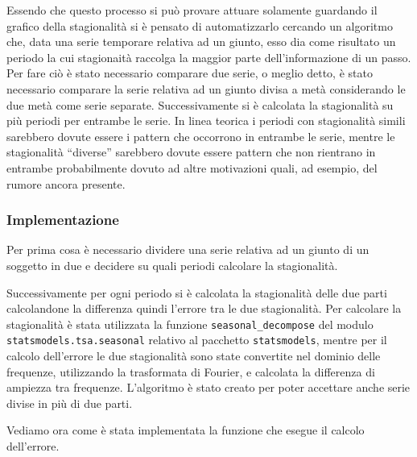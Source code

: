 Essendo che questo processo si può provare attuare solamente guardando il grafico della stagionalità
si è pensato di automatizzarlo cercando un algoritmo che, data una serie temporare relativa ad un giunto,
esso dia come risultato un periodo
la cui stagionaità raccolga la maggior parte dell'informazione di un passo. Per fare ciò è stato 
necessario comparare due serie, o meglio detto, è stato necessario comparare la serie relativa 
ad un giunto divisa a metà considerando le due metà come serie separate. Successivamente
si è calcolata la stagionalità su più periodi per entrambe le serie. In linea teorica i periodi con
stagionalità simili sarebbero dovute essere i pattern che occorrono in entrambe le serie,
mentre le stagionalità ``diverse'' sarebbero dovute essere pattern che non rientrano 
in entrambe probabilmente dovuto ad altre motivazioni quali, ad esempio, del rumore ancora presente.





\subsubsection{Implementazione}
Per prima cosa è necessario dividere una serie relativa ad un giunto di un soggetto in due e decidere
su quali periodi calcolare la stagionalità.

Successivamente per ogni periodo si è calcolata la stagionalità delle due parti
calcolandone la differenza quindi l'errore tra le due stagionalità. Per calcolare la stagionalità
è stata utilizzata la funzione \texttt{seasonal\_decompose} del modulo \texttt{statsmodels.tsa.seasonal}
relativo al pacchetto \texttt{statsmodels}, mentre per il calcolo dell'errore
le due stagionalità sono state convertite nel dominio delle frequenze, utilizzando la trasformata
di Fourier, e calcolata la differenza di ampiezza tra frequenze. L'algoritmo è stato 
creato per poter accettare anche serie divise in più di due parti.

Vediamo ora come è stata implementata la funzione che esegue il calcolo dell'errore.

